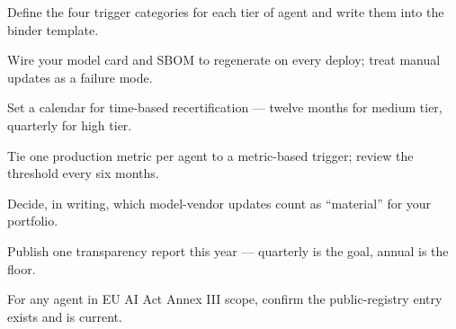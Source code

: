 \begin{TNchecklist}
\item Define the four trigger categories for each tier of agent and write them into the binder template.
\item Wire your model card and SBOM to regenerate on every deploy; treat manual updates as a failure mode.
\item Set a calendar for time-based recertification --- twelve months for medium tier, quarterly for high tier.
\item Tie one production metric per agent to a metric-based trigger; review the threshold every six months.
\item Decide, in writing, which model-vendor updates count as ``material'' for your portfolio.
\item Publish one transparency report this year --- quarterly is the goal, annual is the floor.
\item For any agent in EU AI Act Annex III scope, confirm the public-registry entry exists and is current.
\end{TNchecklist}



